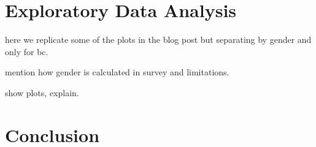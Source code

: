 \documentclass[11pt]{article}
\begin{document}
\section{Exploratory Data Analysis} \label{sec:eda}

here we replicate some of the plots in the blog post but separating by gender and only for bc.

mention how gender is calculated in survey and limitations.

show plots, explain.




\section{Conclusion} \label{sec:conclusion}





%
%
\end{document}
